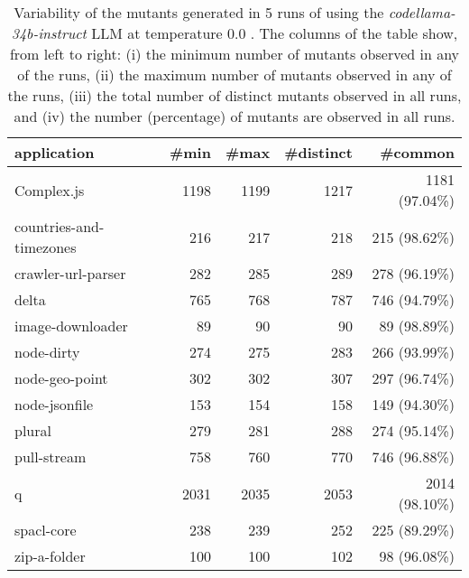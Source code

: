 
\begin{table}[hbt!]
\centering
{\footnotesize
\begin{tabular}{l|r|r|r|r}

{\bf application}  & {\bf \#min} &  {\bf \#max} &  {\bf \#distinct} & {\bf \#common}\\
\hline
Complex.js & 1198 & 1199 & 1217 & 1181 (97.04\%) \\ 
countries-and-timezones & 216 & 217 & 218 & 215 (98.62\%) \\ 
crawler-url-parser & 282 & 285 & 289 & 278 (96.19\%) \\ 
delta & 765 & 768 & 787 & 746 (94.79\%) \\ 
image-downloader & 89 & 90 & 90 & 89 (98.89\%) \\ 
node-dirty & 274 & 275 & 283 & 266 (93.99\%) \\ 
node-geo-point & 302 & 302 & 307 & 297 (96.74\%) \\ 
node-jsonfile & 153 & 154 & 158 & 149 (94.30\%) \\ 
plural & 279 & 281 & 288 & 274 (95.14\%) \\ 
pull-stream & 758 & 760 & 770 & 746 (96.88\%) \\ 
q & 2031 & 2035 & 2053 & 2014 (98.10\%) \\ 
spacl-core & 238 & 239 & 252 & 225 (89.29\%) \\ 
zip-a-folder & 100 & 100 & 102 & 98 (96.08\%) \\ 
\end{tabular}
}
\caption{
  Variability of the mutants generated in 5 runs of \ToolName using the \textit{codellama-34b-instruct} LLM
       at temperature 0.0 . The columns of the table show, from left to right:
    (i) the minimum number of mutants observed in any of the runs,
    (ii) the maximum number of mutants observed in any of the runs,
    (iii) the total number of distinct mutants observed in all runs, and
    (iv) the number (percentage) of mutants are observed in all runs.
}
\label{table:Variability_codellama-34b-instruct_0.0}
\end{table}